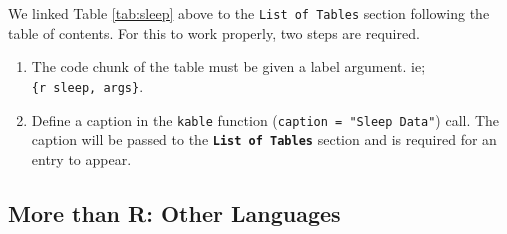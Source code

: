 \documentclass[12pt,oneside]{chicagocapstone}
\providecommand{\tightlist}{%
  \setlength{\itemsep}{0pt}\setlength{\parskip}{0pt}}
\begin{document}
We linked Table \ref{tab:sleep} above to the \texttt{List\ of\ Tables}
section following the table of contents. For this to work properly, two
steps are required.
\begin{enumerate}
\def\labelenumi{\arabic{enumi}.}
\tightlist
\item
  The code chunk of the table must be given a label argument. ie;
  \texttt{\{r\ sleep,\ args\}}.
\item
  Define a caption in the \texttt{kable} function
  (\texttt{caption\ =\ "Sleep\ Data"}) call. The caption will be passed
  to the \textbf{\texttt{List\ of\ Tables}} section and is required for
  an entry to appear.
\end{enumerate}
\subsection*{More than R: Other
Languages}\label{more-than-r-other-languages}
\end{document}
